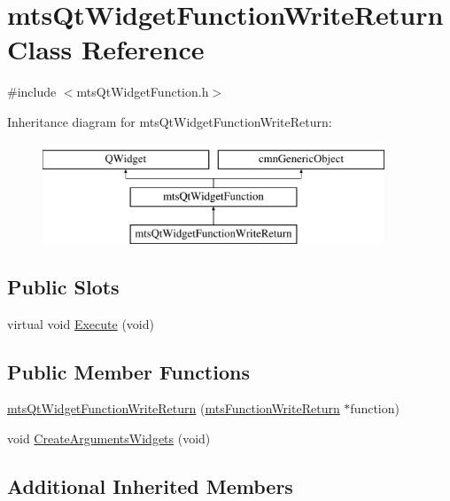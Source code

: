 \hypertarget{classmts_qt_widget_function_write_return}{\section{mts\-Qt\-Widget\-Function\-Write\-Return Class Reference}
\label{classmts_qt_widget_function_write_return}
}


{\ttfamily \#include $<$mts\-Qt\-Widget\-Function.\-h$>$}

Inheritance diagram for mts\-Qt\-Widget\-Function\-Write\-Return\-:\begin{figure}[H]
\begin{center}
\leavevmode
\includegraphics[height=3.000000cm]{da/d15/classmts_qt_widget_function_write_return}
\end{center}
\end{figure}
\subsection*{Public Slots}
\begin{DoxyCompactItemize}
\item 
virtual void \hyperlink{classmts_qt_widget_function_write_return_a8997a2fa074deef7836eca372dcd25fe}{Execute} (void)
\end{DoxyCompactItemize}
\subsection*{Public Member Functions}
\begin{DoxyCompactItemize}
\item 
\hyperlink{classmts_qt_widget_function_write_return_aa9699fc306e29b8cdde7cfbc9b04e357}{mts\-Qt\-Widget\-Function\-Write\-Return} (\hyperlink{classmts_function_write_return}{mts\-Function\-Write\-Return} $\ast$function)
\item 
void \hyperlink{classmts_qt_widget_function_write_return_a4587f7f8daf16a597533fb7cfddfbbaa}{Create\-Arguments\-Widgets} (void)
\end{DoxyCompactItemize}
\subsection*{Additional Inherited Members}


